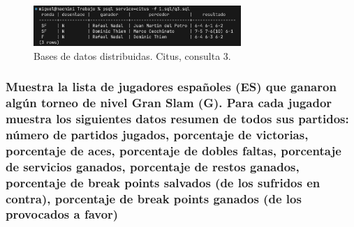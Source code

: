 \begin{figure}[H]
\centering
\includegraphics[width=0.7\textwidth]{fotos/citus/q3.png}
\caption{Bases de datos distribuidas. Citus, consulta 3.}
\label{fig:q3_citus}
\end{figure}




\subsubsection{Muestra la lista de jugadores españoles (ES) que ganaron algún torneo de nivel Gran Slam (G). Para cada jugador muestra los siguientes datos resumen de todos sus partidos: número de partidos jugados, porcentaje de victorias, porcentaje de aces, porcentaje de dobles faltas, porcentaje de servicios ganados, porcentaje de restos ganados, porcentaje de break points salvados (de los sufridos en contra), porcentaje de break points ganados (de los provocados a favor)}

